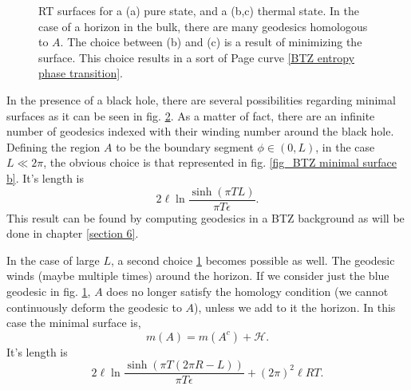 \begin{figure}
\begin{subfigure}[b]{0.3\textwidth}
         \centering
         \caption{}
         \label{fig_BTZ minimal surface c}
     \end{subfigure}
     \hfill
    \caption{RT surfaces for a (a) pure state, and a (b,c) thermal state. In the case of a horizon in the bulk, there are many geodesics homologous to $A$. The choice between (b) and (c) is a result of minimizing the surface. This choice results in a sort of Page curve \ref{BTZ entropy phase transition}.}
    \label{fig_BTZ minimal surface}
\end{figure}

In the presence of a black hole, there are several possibilities regarding minimal surfaces as it can be seen in fig. \ref{fig_BTZ minimal surface}. As a matter of fact, there are an infinite number of geodesics indexed with their winding number around the black hole. Defining the region $A$ to be the boundary segment $\phi\in(0,L)$,  in the case $L\ll2\pi $, the obvious choice is that represented in fig. \ref{fig_BTZ minimal surface b}. It's length is
\begin{equation}\label{length BTZ red}
    2\ell\ln\frac{\sinh\left(\pi T L\right)}{\pi T\epsilon}.
\end{equation}
This result can be found by computing geodesics in a BTZ background as will be done in chapter \ref{section 6}.

In the case of large $L$, a second choice \ref{fig_BTZ minimal surface c} becomes possible as well. The geodesic winds (maybe multiple times) around the horizon. If we consider just the blue geodesic in fig. \ref{fig_BTZ minimal surface c}, $A$ does no longer satisfy the homology condition (we cannot continuously deform the geodesic to $A$), unless we add to it the horizon. In this case the minimal surface is,
\begin{equation}
    m\left(A\right) = m\left(A^c\right) + \mathcal{H}.
\end{equation}
It's length is 
\begin{equation}\label{length BTZ blue}
    2\ell\ln\frac{\sinh\left(\pi T \left(2\pi R-L\right)\right)}{\pi T\epsilon} + \left(2\pi\right)^2\ell RT.
\end{equation}

